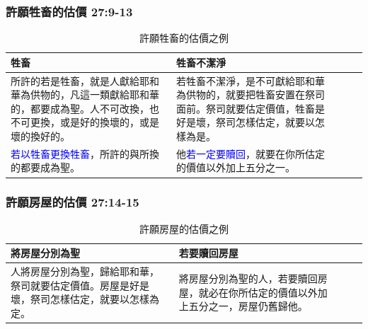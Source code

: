 \subsubsection{許願牲畜的估價 27:9-13}
\begin{table}[H]
\begin{threeparttable}
\begin{tabular}{@{}p{}*{4}{L{\tabcolsep\relax}}@{}}
\toprule
牲畜 &  牲畜不潔淨 \\\hline
所許的若是牲畜，就是人獻給耶和華為供物的，凡這一類獻給耶和華的，都要成為聖。人不可改換，也不可更換，或是好的換壞的，或是壞的換好的。
&若牲畜不潔淨，是不可獻給耶和華為供物的，就要把牲畜安置在祭司面前。祭司就要估定價值，牲畜是好是壞，祭司怎樣估定，就要以怎樣為是。\\\hline
\textcolor{blue}{若以牲畜更換牲畜}，所許的與所換的都要成為聖。
&他\textcolor{blue}{若一定要贖回}，就要在你所估定的價值以外加上五分之一。\\\hline
\bottomrule
\end{tabular}
\caption{許願牲畜的估價之例}
\end{threeparttable}
\end{table} 


\subsubsection{許願房屋的估價 27:14-15}
\begin{table}[H]
\begin{threeparttable}
\begin{tabular}{@{}p{}*{4}{L{\tabcolsep\relax}}@{}}
\toprule
將房屋分別為聖 &  若要贖回房屋 \\\hline
人將房屋分別為聖，歸給耶和華，祭司就要估定價值。房屋是好是壞，祭司怎樣估定，就要以怎樣為定。
&將房屋分別為聖的人，若要贖回房屋，就必在你所估定的價值以外加上五分之一，房屋仍舊歸他。\\\hline
\bottomrule
\end{tabular}
\caption{許願房屋的估價之例}
\end{threeparttable}
\end{table} 

